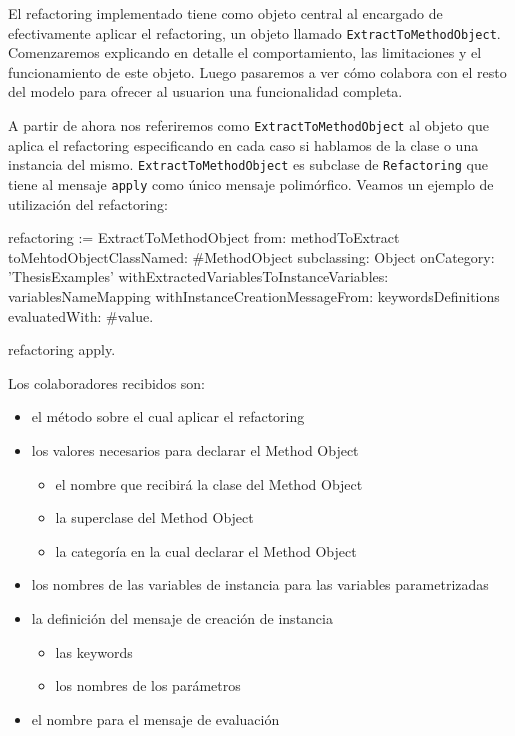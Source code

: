 El refactoring implementado tiene como objeto central al encargado de efectivamente aplicar el refactoring,
un objeto llamado \lstinline{ExtractToMethodObject}. Comenzaremos explicando en detalle el comportamiento,
las limitaciones y el funcionamiento de este objeto. Luego pasaremos a ver cómo colabora con el resto del
modelo para ofrecer al usuarion una funcionalidad completa.

A partir de ahora nos referiremos como \lstinline{ExtractToMethodObject} al objeto que aplica el refactoring
especificando en cada caso si hablamos de la clase o una instancia del mismo. \lstinline{ExtractToMethodObject} es
subclase de \lstinline{Refactoring} que tiene al mensaje \lstinline{apply} como único mensaje polimórfico.
Veamos un ejemplo de utilización del refactoring:

\begin{code}
refactoring := ExtractToMethodObject 
    from: methodToExtract
    toMehtodObjectClassNamed: #MethodObject
    subclassing: Object
    onCategory: 'ThesisExamples'
    withExtractedVariablesToInstanceVariables: variablesNameMapping
    withInstanceCreationMessageFrom: keywordsDefinitions
    evaluatedWith: #value.

refactoring apply.
\end{code}

Los colaboradores recibidos son:

\begin{itemize}
    \item el método sobre el cual aplicar el refactoring
    \item los valores necesarios para declarar el Method Object
    \begin{itemize}
        \item el nombre que recibirá la clase del Method Object
        \item la superclase del Method Object
        \item la categoría en la cual declarar el Method Object
    \end{itemize}
    \item los nombres de las variables de instancia para las variables parametrizadas
    \item la definición del mensaje de creación de instancia
    \begin{itemize}
        \item las keywords
        \item los nombres de los parámetros
    \end{itemize}
    \item el nombre para el mensaje de evaluación
\end{itemize}

